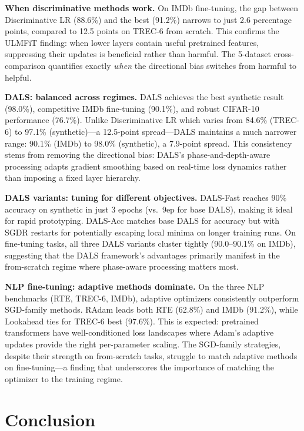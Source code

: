 \documentclass[a4paper,fleqn]{cas-dc}
\begin{document}
\textbf{When discriminative methods work.} On IMDb fine-tuning, the gap between Discriminative LR (88.6\%) and the best (91.2\%) narrows to just 2.6 percentage points, compared to 12.5 points on TREC-6 from scratch. This confirms the ULMFiT finding: when lower layers contain useful pretrained features, suppressing their updates is beneficial rather than harmful. The 5-dataset cross-comparison quantifies exactly \emph{when} the directional bias switches from harmful to helpful.

\textbf{DALS: balanced across regimes.} DALS achieves the best synthetic result (98.0\%), competitive IMDb fine-tuning (90.1\%), and robust CIFAR-10 performance (76.7\%). Unlike Discriminative LR which varies from 84.6\% (TREC-6) to 97.1\% (synthetic)---a 12.5-point spread---DALS maintains a much narrower range: 90.1\% (IMDb) to 98.0\% (synthetic), a 7.9-point spread. This consistency stems from removing the directional bias: DALS's phase-and-depth-aware processing adapts gradient smoothing based on real-time loss dynamics rather than imposing a fixed layer hierarchy.

\textbf{DALS variants: tuning for different objectives.} DALS-Fast reaches 90\% accuracy on synthetic in just 3 epochs (vs.\ 9ep for base DALS), making it ideal for rapid prototyping. DALS-Acc matches base DALS for accuracy but with SGDR restarts for potentially escaping local minima on longer training runs. On fine-tuning tasks, all three DALS variants cluster tightly (90.0--90.1\% on IMDb), suggesting that the DALS framework's advantages primarily manifest in the from-scratch regime where phase-aware processing matters most.

\textbf{NLP fine-tuning: adaptive methods dominate.} On the three NLP benchmarks (RTE, TREC-6, IMDb), adaptive optimizers consistently outperform SGD-family methods. RAdam leads both RTE (62.8\%) and IMDb (91.2\%), while Lookahead ties for TREC-6 best (97.6\%). This is expected: pretrained transformers have well-conditioned loss landscapes where Adam's adaptive updates provide the right per-parameter scaling. The SGD-family strategies, despite their strength on from-scratch tasks, struggle to match adaptive methods on fine-tuning---a finding that underscores the importance of matching the optimizer to the training regime.

\section{Conclusion}\label{sec:conclusion}
\end{document}
